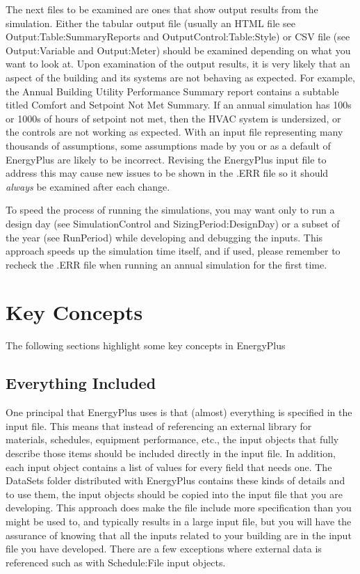 The next files to be examined are ones that show output results from
the simulation. Either the tabular output file (usually an HTML file
see Output:Table:SummaryReports and OutputControl:Table:Style) or
CSV file (see Output:Variable and Output:Meter) should be examined
depending on what you want to look at. Upon examination of the output
results, it is very likely that an aspect of the building and its
systems are not behaving as expected. For example, the \textquotedbl Annual
Building Utility Performance Summary\textquotedbl{} report contains
a subtable titled \textquotedbl Comfort and Setpoint Not Met Summary\textquotedbl .
If an annual simulation has 100s or 1000s of hours of setpoint not
met, then the HVAC system is undersized, or the controls are not working
as expected. With an input file representing many thousands of assumptions,
some assumptions made by you or as a default of EnergyPlus are likely
to be incorrect. Revising the EnergyPlus input file to address this
may cause new issues to be shown in the .ERR file so it should \emph{always}
be examined after each change.

To speed the process of running the simulations, you may want only
to run a design day (see SimulationControl and SizingPeriod:DesignDay)
or a subset of the year (see RunPeriod) while developing and debugging
the inputs. This approach speeds up the simulation time itself, and
if used, please remember to recheck the .ERR file when running an
annual simulation for the first time.

\section{Key Concepts}

The following sections highlight some key concepts in EnergyPlus

\subsection*{Everything Included}

One principal that EnergyPlus uses is that (almost) everything is
specified in the input file. This means that instead of referencing
an external library for materials, schedules, equipment performance,
etc., the input objects that fully describe those items should be
included directly in the input file. In addition, each input object
contains a list of values for every field that needs one. The DataSets
folder distributed with EnergyPlus contains these kinds of details
and to use them, the input objects should be copied into the input
file that you are developing. This approach does make the file include
more specification than you might be used to, and typically results
in a large input file, but you will have the assurance of knowing
that all the inputs related to your building are in the input file
you have developed. There are a few exceptions where external data
is referenced such as with Schedule:File input objects.

